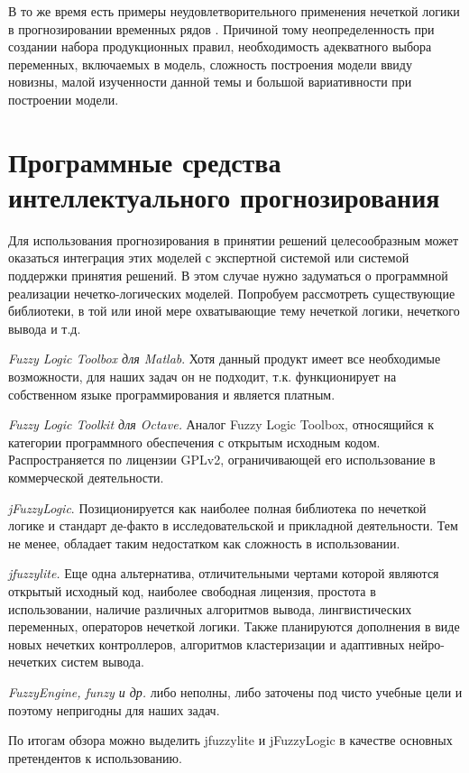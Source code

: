 В то же время есть примеры неудовлетворительного применения нечеткой логики в прогнозировании временных рядов \cite{Hoekstr2010}. 
Причиной тому неопределенность при создании набора продукционных правил, необходимость адекватного выбора переменных, 
включаемых в модель, сложность построения модели ввиду новизны, малой изученности данной темы и большой вариативности при построении модели.

\newpage
\section{Программные средства интеллектуального прогнозирования}

Для использования прогнозирования в принятии решений целесообразным может оказаться интеграция этих моделей с экспертной системой или системой поддержки принятия решений. 
В этом случае нужно задуматься о программной реализации нечетко-логических моделей. 
Попробуем рассмотреть существующие библиотеки, в той или иной мере охватывающие тему нечеткой логики, нечеткого вывода и т.д.

\textit{Fuzzy Logic Toolbox для Matlab}. Хотя данный продукт имеет все необходимые возможности, для наших задач он не подходит, т.к. функционирует на собственном языке программирования и является платным.

\textit{Fuzzy Logic Toolkit для Octave.} Аналог Fuzzy Logic Toolbox, относящийся к категории программного обеспечения с открытым исходным кодом. Распространяется по лицензии GPLv2, ограничивающей его использование в коммерческой деятельности.

\textit{jFuzzyLogic}. Позиционируется как наиболее полная библиотека по нечеткой логике и стандарт де-факто в исследовательской и прикладной деятельности. Тем не менее, обладает таким недостатком как сложность в использовании.

\textit{jfuzzylite.} Еще одна альтернатива, отличительными чертами которой являются открытый исходный код, наиболее свободная лицензия, простота в использовании, наличие различных алгоритмов вывода, лингвистических переменных, операторов нечеткой логики. Также планируются дополнения в виде новых нечетких контроллеров, алгоритмов кластеризации и адаптивных нейро-нечетких систем вывода.

\textit{FuzzyEngine, funzy и др.} либо неполны, либо заточены под чисто учебные цели и поэтому непригодны для наших задач. 

По итогам обзора можно выделить jfuzzylite и jFuzzyLogic в качестве основных претендентов к использованию.

